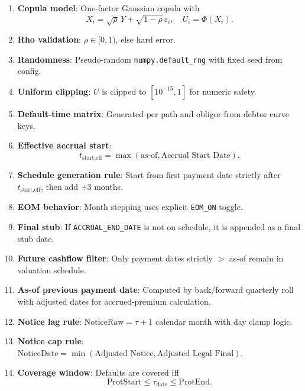 \documentclass[11pt]{article}
\begin{document}
\begin{enumerate}[label=\arabic*),leftmargin=*,align=left]
\item \textbf{Copula model}: One-factor Gaussian copula with
\[
X_i=\sqrt{\rho}\,Y+\sqrt{1-\rho}\,\varepsilon_i,\quad U_i=\Phi(X_i).
\]
\item \textbf{Rho validation}: \(\rho\in[0,1)\), else hard error.
\item \textbf{Randomness}: Pseudo-random \texttt{numpy.default\_rng} with fixed seed from config.
\item \textbf{Uniform clipping}: \(U\) is clipped to \([10^{-15},1]\) for numeric safety.
\item \textbf{Default-time matrix}: Generated per path and obligor from debtor curve keys.

\item \textbf{Effective accrual start}: 
\[
t_{\text{start,eff}}=\max(\text{as-of},\text{Accrual Start Date}).
\]
\item \textbf{Schedule generation rule}: Start from first payment date strictly after \(t_{\text{start,eff}}\), then add \(+3\) months.
\item \textbf{EOM behavior}: Month stepping uses explicit \texttt{EOM\_ON} toggle.
\item \textbf{Final stub}: If \texttt{ACCRUAL\_END\_DATE} is not on schedule, it is appended as a final stub date.
\item \textbf{Future cashflow filter}: Only payment dates strictly \(>\) as-of remain in valuation schedule.
\item \textbf{As-of previous payment date}: Computed by back/forward quarterly roll with adjusted dates for accrued-premium calculation.
\item \textbf{Notice lag rule}: \(\text{NoticeRaw}=\tau+1\) calendar month with day clamp logic.
\item \textbf{Notice cap rule}: \(\text{NoticeDate}=\min(\text{Adjusted Notice},\text{Adjusted Legal Final})\).
\item \textbf{Coverage window}: Defaults are covered iff
\[
\text{ProtStart}\le \tau_{\text{date}} \le \text{ProtEnd}.
\]


\end{enumerate}
\end{document}
